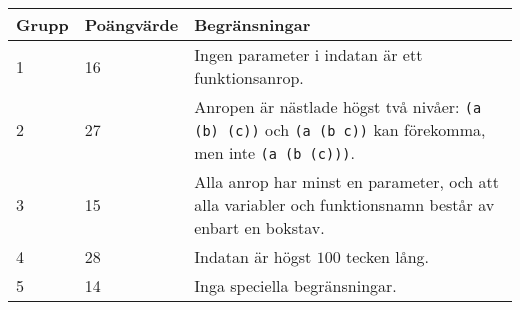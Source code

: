 \begin{tabular}{|l|l|l|}
\hline
Grupp & Poängvärde & Begränsningar \\ \hline
1     & 16         & Ingen parameter i indatan är ett funktionsanrop. \\ \hline
2     & 27         & Anropen är nästlade högst två nivåer: \texttt{(a (b) (c))} och \texttt{(a (b c))} kan förekomma, men inte \texttt{(a (b (c)))}. \\ \hline
3     & 15         & Alla anrop har minst en parameter, och att alla variabler och funktionsnamn består av enbart en bokstav. \\ \hline
4     & 28         & Indatan är högst $100$ tecken lång. \\ \hline
5     & 14         & Inga speciella begränsningar. \\ \hline
\end{tabular}
